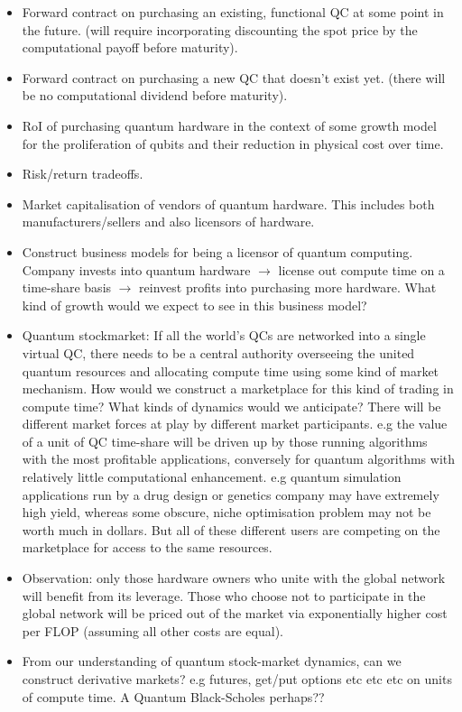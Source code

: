 \documentclass[aps,rmp,twocolumn,amsmath,amssymb,nofootinbib,superscriptaddress,longbibliography,floatfix,table-of-contents,eqsecnum]{revtex4-1}
\begin{document}
\begin{itemize}
	\item Forward contract on purchasing an existing, functional QC at some point in the future. (will require incorporating discounting the spot price by the computational payoff before maturity).
	\item Forward contract on purchasing a new QC that doesn't exist yet. (there will be no computational dividend before maturity).
	\item RoI of purchasing quantum hardware in the context of some growth model for the proliferation of qubits and their reduction in physical cost over time.
	\item Risk/return tradeoffs.
	\item Market capitalisation of vendors of quantum hardware. This includes both manufacturers/sellers and also licensors of hardware.
	\item Construct business models for being a licensor of quantum computing. Company invests into quantum hardware $\to$ license out compute time on a time-share basis $\to$ reinvest profits into purchasing more hardware. What kind of growth would we expect to see in this business model?
	\item Quantum stockmarket: If all the world's QCs are networked into a single virtual QC, there needs to be a central authority overseeing the united quantum resources and allocating compute time using some kind of market mechanism. How would we construct a marketplace for this kind of trading in compute time? What kinds of dynamics would we anticipate? There will be different market forces at play by different market participants. e.g the value of a unit of QC time-share will be driven up by those running algorithms with the most profitable applications, conversely for quantum algorithms with relatively little computational enhancement. e.g quantum simulation applications run by a drug design or genetics company may have extremely high yield, whereas some obscure, niche optimisation problem may not be worth much in dollars. But all of these different users are competing on the marketplace for access to the same resources.
	\item Observation: only those hardware owners who unite with the global network will benefit from its leverage. Those who choose not to participate in the global network will be priced out of the market via exponentially higher cost per FLOP (assuming all other costs are equal).
	\item From our understanding of quantum stock-market dynamics, can we construct derivative markets? e.g futures, get/put options etc etc etc on units of compute time. A Quantum Black-Scholes perhaps??
\end{itemize}
\end{document}
